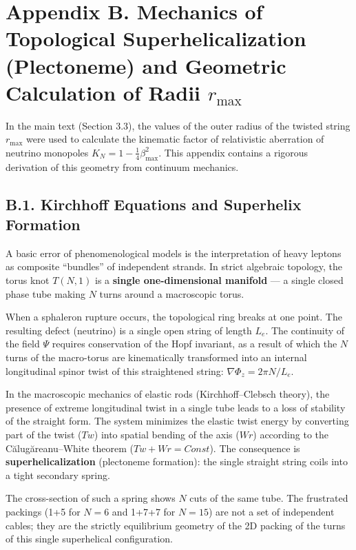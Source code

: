 \documentclass[11pt,a4paper]{article}
\begin{document}
\section*{Appendix B. Mechanics of Topological Superhelicalization (Plectoneme) and Geometric Calculation of Radii $r_{\text{max}}$}

In the main text (Section 3.3), the values of the outer radius of the twisted string $r_{\text{max}}$ were used to calculate the kinematic factor of relativistic aberration of neutrino monopoles $K_N = 1 - \frac{1}{4}\beta_{\text{max}}^2$. This appendix contains a rigorous derivation of this geometry from continuum mechanics.

\subsection*{B.1. Kirchhoff Equations and Superhelix Formation}
A basic error of phenomenological models is the interpretation of heavy leptons as composite ``bundles'' of independent strands. In strict algebraic topology, the torus knot $T(N,1)$ is a \textbf{single one-dimensional manifold} — a single closed phase tube making $N$ turns around a macroscopic torus.

When a sphaleron rupture occurs, the topological ring breaks at one point. The resulting defect (neutrino) is a single open string of length $L_e$. The continuity of the field $\Psi$ requires conservation of the Hopf invariant, as a result of which the $N$ turns of the macro-torus are kinematically transformed into an internal longitudinal spinor twist of this straightened string: $\nabla \Phi_z = 2\pi N / L_e$.

In the macroscopic mechanics of elastic rods (Kirchhoff–Clebsch theory), the presence of extreme longitudinal twist in a single tube leads to a loss of stability of the straight form. The system minimizes the elastic twist energy by converting part of the twist ($Tw$) into spatial bending of the axis ($Wr$) according to the Călugăreanu–White theorem ($Tw + Wr = Const$).
The consequence is \textbf{superhelicalization} (plectoneme formation): the single straight string coils into a tight secondary spring.

The cross-section of such a spring shows $N$ cuts of the same tube. The frustrated packings (1+5 for $N=6$ and 1+7+7 for $N=15$) are not a set of independent cables; they are the strictly equilibrium geometry of the 2D packing of the turns of this single superhelical configuration.
\end{document}

